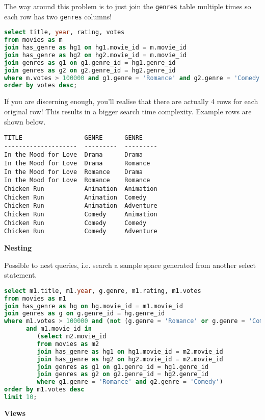 \documentclass[12pt,a4paper]{article} %
\begin{document}
The way around this problem is to just join the \verb|genres| table multiple times so each row has two \verb|genres| columns!
\begin{lstlisting}[language=sql]
select title, year, rating, votes
from movies as m
join has_genre as hg1 on hg1.movie_id = m.movie_id
join has_genre as hg2 on hg2.movie_id = m.movie_id
join genres as g1 on g1.genre_id = hg1.genre_id
join genres as g2 on g2.genre_id = hg2.genre_id
where m.votes > 100000 and g1.genre = 'Romance' and g2.genre = 'Comedy'
order by votes desc;
\end{lstlisting}
If you are discerning enough, you'll realise that there are actually 4 rows for each original row! This results in a bigger search time complexity. Example rows are shown below.
\begin{lstlisting}
TITLE                 GENRE      GENRE
--------------------  ---------  ---------
In the Mood for Love  Drama      Drama
In the Mood for Love  Drama      Romance
In the Mood for Love  Romance    Drama
In the Mood for Love  Romance    Romance
Chicken Run           Animation  Animation
Chicken Run           Animation  Comedy
Chicken Run           Animation  Adventure
Chicken Run           Comedy     Animation
Chicken Run           Comedy     Comedy
Chicken Run           Comedy     Adventure
\end{lstlisting}
\textbf{Nesting}

Possible to nest queries, i.e. search a sample space generated from another select statement.
\begin{lstlisting}[language=sql]
select m1.title, m1.year, g.genre, m1.rating, m1.votes
from movies as m1
join has_genre as hg on hg.movie_id = m1.movie_id
join genres as g on g.genre_id = hg.genre_id
where m1.votes > 100000 and (not (g.genre = 'Romance' or g.genre = 'Comedy'))
      and m1.movie_id in
         (select m2.movie_id
         from movies as m2
         join has_genre as hg1 on hg1.movie_id = m2.movie_id
         join has_genre as hg2 on hg2.movie_id = m2.movie_id
         join genres as g1 on g1.genre_id = hg1.genre_id
         join genres as g2 on g2.genre_id = hg2.genre_id
         where g1.genre = 'Romance' and g2.genre = 'Comedy')
order by m1.votes desc
limit 10;
\end{lstlisting}
\textbf{Views}
\end{document}
